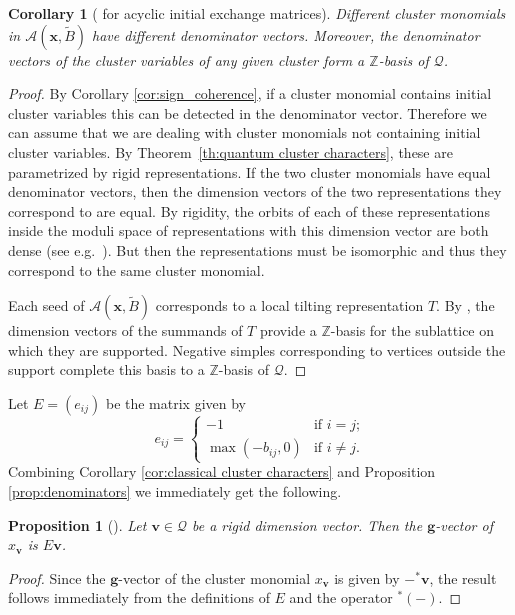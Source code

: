 \documentclass[12pt]{amsart}
\newtheorem{corollary}[theorem]{Corollary}
\newtheorem{proposition}[theorem]{Proposition}
\newcommand{\bfg}{\mathbf{g}}
\newcommand{\bfv}{\mathbf{v}}
\newcommand{\bfx}{\mathbf{x}}
\newcommand{\cA}{\mathcal{A}}
\newcommand{\cQ}{\mathcal{Q}}
\newcommand{\ZZ}{\mathbb{Z}}
\begin{document}
  \begin{corollary}[{\cite[Conjecture 7.6]{fomin-zelevinsky4}} for acyclic initial exchange matrices]
    \label{cor:d_vect basis}
    Different cluster monomials in $\cA(\bfx,\widetilde{B})$ have different denominator vectors.
    Moreover, the denominator vectors of the cluster variables of any given cluster form a $\ZZ$-basis of $\cQ$.
  \end{corollary}
  \begin{proof}
    By Corollary \ref{cor:sign_coherence}, if a cluster monomial contains initial cluster variables this can be detected in the denominator vector.
    Therefore we can assume that we are dealing with cluster monomials not containing initial cluster variables.
    By Theorem~\ref{th:quantum cluster characters}, these are parametrized by rigid representations.
    If the two cluster monomials have equal denominator vectors, then the dimension vectors of the two representations they correspond to are equal.
    By rigidity, the orbits of each of these representations inside the moduli space of representations with this dimension vector are both dense (see e.g.\ \cite[Corollary 2.2.5]{brion}).
    But then the representations must be isomorphic and thus they correspond to the same cluster monomial.

    Each seed of $\cA(\bfx,\widetilde{B})$ corresponds to a local tilting representation $T$.
    By \cite[Lemma 4.3 and Theorem 4.5]{happel-ringel}, the dimension vectors of the summands of $T$ provide a $\ZZ$-basis for the sublattice on which they are supported.
    Negative simples corresponding to vertices outside the support complete this basis to a $\ZZ$-basis of $\cQ$.
  \end{proof}
 
  Let $E=(e_{ij})$ be the matrix given by
  \[
    e_{ij}
    =
    \begin{cases} 
      -1 & \text{if $i=j$;}\\ 
      \max(-b_{ij},0) & \text{if $i\ne j$.}
    \end{cases}
  \]
  Combining Corollary \ref{cor:classical cluster characters} and Proposition \ref{prop:denominators} we immediately get the following.
  \begin{proposition}[{\cite[Conjecture 3.21]{reading-speyer}}]
    \label{prop:d to g}
    Let $\bfv\in\cQ$ be a rigid dimension vector.
    Then the $\bfg$-vector of $x_\bfv$ is $E\bfv$.
  \end{proposition}
  \begin{proof}
    Since the $\bfg$-vector of the cluster monomial $x_\bfv$ is given by $-{}^*\bfv$, the result follows immediately from the definitions of $E$ and the operator ${}^*(-)$.
  \end{proof}
  
\end{document}
